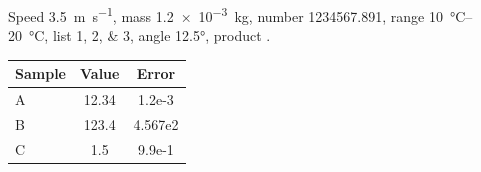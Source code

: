 \documentclass{article}
\begin{document}
Speed \qty{3.5}{\metre\per\second}, mass \qty{1.2e-3}{\kilo\gram}, number \num{1234567.891}, range \qtyrange{10}{20}{\celsius}, list \numlist{1;2;3}, angle \ang{12.5}, product .
\begin{table}[ht]\centering
\begin{tabular}{l S[table-format=3.2] S[table-format=1.3e1]}
\toprule Sample & {Value} & {Error} \\ \midrule
A & 12.34 & 1.2e-3 \\ B & 123.4 & 4.567e2 \\ C & 1.5 & 9.9e-1 \\ \bottomrule
\end{tabular}\end{table}
\end{document}
